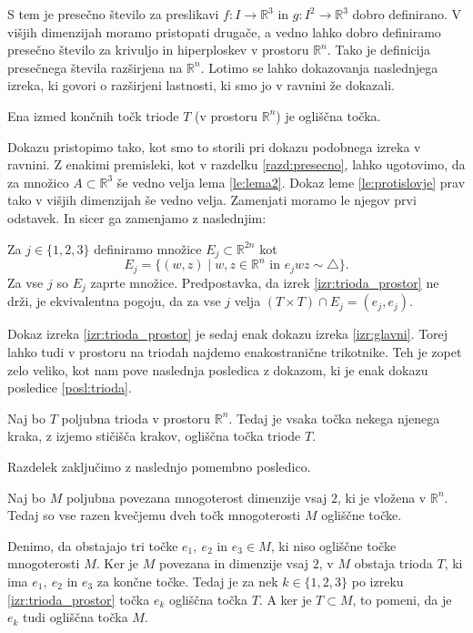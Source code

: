 \documentclass[mat1]{fmfdelo}
\newcommand{\R}{\mathbb R}
\begin{document}
S tem je presečno število za preslikavi $f \colon I \to \R^3$ in $g \colon I^2 \to \R^3$ dobro definirano. V višjih dimenzijah moramo pristopati drugače, a vedno lahko dobro definiramo presečno število za krivuljo in hiperploskev v prostoru $\R^n$. Tako je definicija presečnega števila razširjena na $\R^n$. Lotimo se lahko dokazovanja naslednjega izreka, ki govori o razširjeni lastnosti, ki smo jo v ravnini že dokazali.

\begin{izrek}\label{izr:trioda_prostor}
Ena izmed končnih točk triode $T$ (v prostoru $\R^n$) je ogliščna točka.
\end{izrek} 

Dokazu pristopimo tako, kot smo to storili pri dokazu podobnega izreka v ravnini. Z enakimi premisleki, kot v razdelku \ref{razd:presecno}, lahko ugotovimo, da za množico $A \subset \R^3$ še vedno velja lema \ref{le:lema2}. Dokaz leme \ref{le:protislovje} prav tako v višjih dimenzijah še vedno velja. Zamenjati moramo le njegov prvi odstavek. In sicer ga zamenjamo z  naslednjim:

Za $j \in \{1, 2, 3\}$ definiramo množice $E_j \subset \R^{2n}$ kot 
\[
E_j = \{ (w, z) \mid w, z \in \R^n \text{ in } e_jwz \sim \triangle \}.
\] 
Za vse $j$ so $E_j$ zaprte množice. Predpostavka, da izrek \ref{izr:trioda_prostor} ne drži, je ekvivalentna pogoju, da za vse $j$ velja $(T \times T) \cap E_j = (e_j, e_j)$.

Dokaz izreka \ref{izr:trioda_prostor} je sedaj enak dokazu izreka \ref{izr:glavni}. Torej lahko tudi v prostoru na triodah najdemo enakostranične trikotnike. Teh je zopet zelo veliko, kot nam pove naslednja posledica z dokazom, ki je enak dokazu posledice \ref{posl:trioda}.

\begin{posledica}
Naj bo $T$ poljubna trioda v prostoru $\R^n$. Tedaj je vsaka točka nekega njenega kraka, z izjemo stičišča krakov, ogliščna točka triode $T$.
\end{posledica}

Razdelek zaključimo z naslednjo pomembno posledico.

\begin{posledica}
Naj bo $M$ poljubna povezana mnogoterost dimenzije vsaj $2$, ki je vložena v $\R^n$. Tedaj so vse razen kvečjemu dveh točk mnogoterosti $M$ ogliščne točke.
\end{posledica}

\proof
Denimo, da obstajajo tri točke $e_1,\ e_2$ in $e_3 \in M$, ki niso ogliščne točke mnogoterosti $M$. Ker je $M$ povezana in dimenzije vsaj $2$, v $M$ obstaja trioda $T$, ki ima $e_1,\ e_2$ in $e_3$ za končne točke. Tedaj je za nek $k \in \{1, 2, 3\}$ po izreku \ref{izr:trioda_prostor} točka $e_k$ ogliščna točka $T$. A ker je $T \subset M$, to pomeni, da je $e_k$ tudi ogliščna točka $M$.
\endproof
\end{document}
